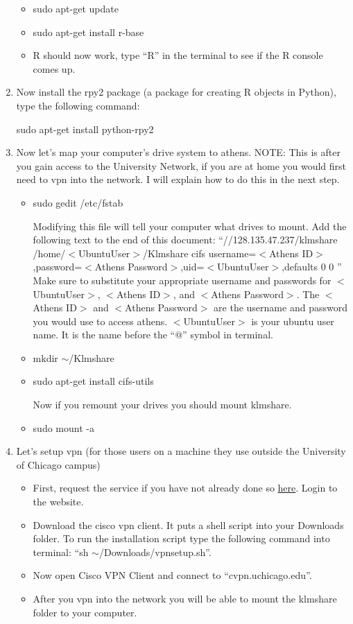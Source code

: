 \documentclass{article}
\begin{document}
\begin{enumerate}
\begin{itemize}
		 \item sudo apt-get update
		 \item sudo apt-get install r-base
		 \item R should now work, type ``R'' in the terminal to see if the R console comes up. 

	\end{itemize}
\item Now install the rpy2 package (a package for creating R objects in Python), type the following command:

sudo apt-get install python-rpy2

\item Now let's map your computer's drive system to athens. NOTE: This is after you gain access to the University Network, 
if you are at home you would first need to vpn into the network. I will explain how to do this in the next step.

	\begin{itemize}
		\item  sudo gedit /etc/fstab

		Modifying this file will tell your computer what drives to mount. Add the following text to the
		end of this document: ``//128.135.47.237/klmshare /home/$<$UbuntuUser$>$/Klmshare cifs username=$<$Athens ID$>$,password=$<$Athens Password$>$,uid=$<$UbuntuUser$>$,defaults 0 0 ''
		Make sure to substitute your appropriate username and passwords for $<$UbuntuUser$>$, $<$Athens ID$>$, and $<$Athens Password$>$. The $<$Athens ID$>$ and $<$Athens Password$>$ are the
		username and password you would use to access athens. $<$UbuntuUser$>$ is your ubuntu user name. It is the name before the ``@'' symbol in terminal. 
		
		\item mkdir $\sim$/Klmshare

		\item sudo apt-get install cifs-utils

		Now if you remount your drives you should mount klmshare. 

		\item sudo mount -a

	\end{itemize}

\item Let's setup vpn (for those users on a machine they use outside the University of Chicago campus)

	\begin{itemize}
		\item First, request the service if you have not already done so \href{https://cvpn.uchicago.edu/}{here}. Login to the website. 
		\item Download the cisco vpn client. It puts a shell script into your Downloads folder. To run the installation 
		script type the following command into terminal: ``sh $\sim$/Downloads/vpnsetup.sh''.
		\item Now open Cisco VPN Client and connect to ``cvpn.uchicago.edu''.
		\item After you vpn into the network you will be able to mount the klmshare folder to your computer. 
	\end{itemize}


\end{enumerate}
\end{document}
